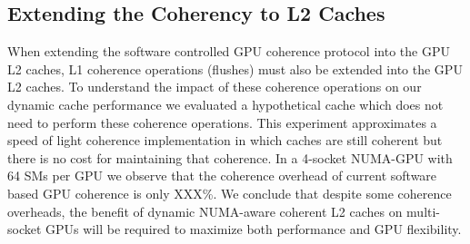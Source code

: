 

\subsection{Extending the Coherency to L2 Caches}

When extending the software controlled GPU coherence protocol into the GPU L2 
caches, L1 coherence operations (flushes) must also be extended into the GPU 
L2 caches.  To understand the impact of these coherence operations on our 
dynamic cache performance we evaluated a hypothetical cache which does not 
need to perform these coherence operations.  This experiment approximates a 
speed of light coherence implementation in which caches are still coherent 
but there is no cost for maintaining that coherence. In a 4-socket NUMA-GPU 
with 64 SMs per GPU we observe that the coherence overhead of current 
software based GPU coherence is only XXX\%. We conclude that despite some 
coherence overheads, the benefit of dynamic NUMA-aware coherent L2 caches on 
multi-socket GPUs will be required to maximize both performance and GPU 
flexibility. 


